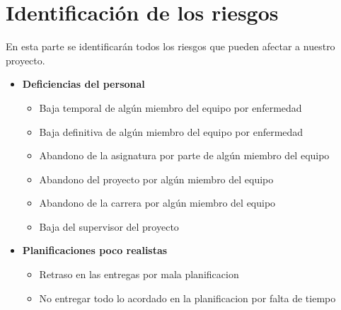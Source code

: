 \documentclass[spanish,a4paper,11pt, twoside]{report}	%
\begin{document}

\tableofcontents 							%


\newpage
\mbox{}
\thispagestyle{empty}						%
\newpage
\setcounter{section}{0}

\part{Identificación de los riesgos}
En esta parte se identificarán todos los riesgos que pueden afectar a nuestro proyecto.
\begin{itemize}
\item \textbf {Deficiencias del personal}
	\begin{itemize}
		\item {Baja temporal de algún miembro del equipo por enfermedad}
		\item {Baja definitiva de algún miembro del equipo por enfermedad}
		\item {Abandono de la asignatura por parte de algún miembro del equipo}
		\item {Abandono del proyecto por algún miembro del equipo}
		\item {Abandono de la carrera por algún miembro del equipo}
		\item {Baja del supervisor del proyecto}
	\end{itemize}
\item \textbf {Planificaciones poco realistas}
	\begin{itemize}
		\item {Retraso en las entregas por mala planificacion}
		\item {No entregar todo lo acordado en la planificacion por falta de tiempo}


\end{itemize}
\end{itemize}
\end{document}
